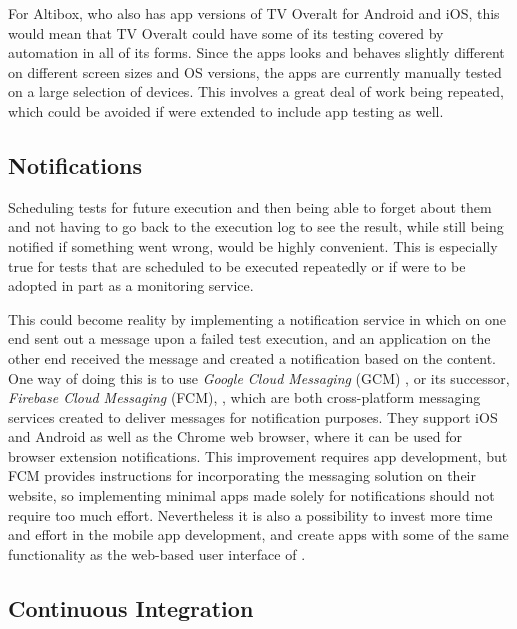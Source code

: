 For Altibox, who also has app versions of TV Overalt for Android and iOS, this would mean that TV Overalt could have some of its testing covered by automation in all of its forms. Since the apps looks and behaves slightly different on different screen sizes and OS versions, the apps are currently manually tested on a large selection of devices. This involves a great deal of work being repeated, which could be avoided if \toolname \space were extended to include app testing as well.
    
\subsection{Notifications}

Scheduling tests for future execution and then being able to forget about them and not having to go back to the execution log to see the result, while still being notified if something went wrong, would be highly convenient. This is especially true for tests that are scheduled to be executed repeatedly or if \toolname \space were to be adopted in part as a monitoring service.

This could become reality by implementing a notification service in which \toolname \space on one end sent out a message upon a failed test execution, and an application on the other end received the message and created a notification based on the content. One way of doing this is to use \emph{Google Cloud Messaging} (GCM) \cite{gcm}, or its successor, \emph{Firebase Cloud Messaging} (FCM), \cite{fcm}, which are both cross-platform messaging services created to deliver messages for notification purposes. They support iOS and Android as well as the Chrome web browser, where it can be used for browser extension notifications. This improvement requires app development, but FCM provides instructions for incorporating the messaging solution on their website, so implementing minimal apps made solely for notifications should not require too much effort. Nevertheless it is also a possibility to invest more time and effort in the mobile app development, and create apps with some of the same functionality as the web-based user interface of \toolname.




\subsection{Continuous Integration}\label{further_work.ci}

